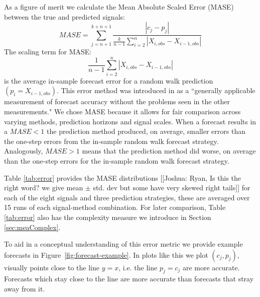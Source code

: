 As a figure of merit we calculate the Mean Absolute Scaled Error (MASE)\cite{MASE} between the true and predicted signals: 
$$MASE = \sum_{j=n+1}^{k+n+1}\frac{|c_j-p_j| }{\frac{k}{n-1}\sum^n_{i=2}|X_{i,obs}-X_{i-1,obs}|}$$
The scaling term for MASE:
$$\frac{1}{n-1}\sum^n_{i=2}|X_{i,obs}-X_{i-1,obs}|$$ 
is the average in-sample forecast error for a random walk prediction $(p_i=X_{i-1,obs})$. This error method was introduced in \cite{MASE} as a ``generally applicable measurement of forecast accuracy without the problems seen in the other measurements." We chose MASE because it allows for fair comparison across varying methods, prediction horizons and signal scales. When a forecast results in a $MASE<1$ the prediction method produced, on average, smaller errors than the one-step errors from the in-sample random walk forecast strategy. Analogously, $MASE>1$ means that the prediction method did worse, on average than the one-step errors for the in-sample random walk forecast strategy. 

Table \ref{tab:error} provides the MASE distributions {\color{red}[[Joshua: Ryan, Is this the right word? we give mean $\pm$ std. dev but some have very skewed right tails]]} for each of the eight signals and three prediction strategies, these are averaged over 15 runs of each signal-method combination. For later comparison, Table \ref{tab:error} also has the complexity measure we introduce in Section  \ref{sec:meaComplex}. 



To aid in a conceptual understanding of this error metric we provide example forecasts in Figure~\ref{fig:forecast-example}. In plots like this we plot $(c_j,p_j)$, visually points close to the line $y=x$, i.e. the line $p_j = c_j$ are more accurate. Forecasts which stay close to the line are more accurate than forecasts that stray away from it. 


